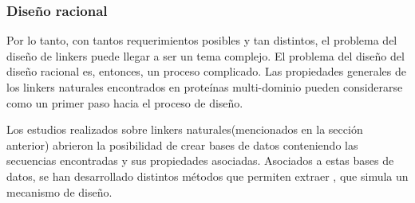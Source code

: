 \subsubsection{Diseño racional}


Por lo tanto, con tantos requerimientos posibles y tan distintos, el problema del diseño de linkers puede llegar a ser un tema complejo.
El problema del diseño del diseño racional es, entonces, un proceso complicado.
Las propiedades generales de los linkers naturales encontrados en proteínas multi-dominio pueden considerarse como un primer paso hacia el proceso de diseño.
% 

Los estudios realizados sobre linkers naturales(mencionados en la sección anterior) abrieron la posibilidad de crear bases de datos conteniendo las secuencias encontradas y sus propiedades asociadas.
Asociados a estas bases de datos, se han desarrollado distintos métodos que permiten extraer  ,  que simula un mecanismo de diseño.

